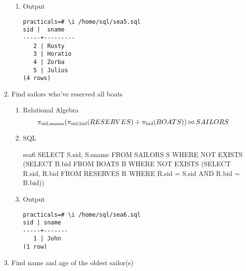 \begin{enumerate}
\begin{enumerate}
                  \item Output
                        \begin{lstlisting}[style=output]
practicals=# \i /home/sql/sea5.sql
sid |  sname  
-----+---------
   2 | Rusty
   3 | Horatio
   4 | Zorba
   5 | Julius
(4 rows)
                        \end{lstlisting}

            \end{enumerate}

      \item Find sailors who've reserved all boats

            \begin{enumerate}
                  \item Relational Algebra
                        \begin{equation*}
                              \pi_{\text{sid}, \text{sname}}(\pi_{\text{sid}, \text{bid}}(RESERVES) \div \pi_{\text{bid}}(BOATS)) \\
                              \bowtie SAILORS
                        \end{equation*}
                        \pagebreak
                  \item SQL
                        \begin{sqlQuery}{sea6}
                        SELECT S.sid, S.sname
                        FROM SAILORS S
                        WHERE NOT EXISTS
                              (SELECT B.bid
                              FROM BOATS B
                              WHERE NOT EXISTS
                                    (SELECT R.sid, R.bid
                                    FROM RESERVES R
                                    WHERE R.sid = S.sid
                                          AND R.bid = B.bid))
                  \end{sqlQuery}

                  \item Output
                        \begin{lstlisting}[style=output]
practicals=# \i /home/sql/sea6.sql
sid | sname 
-----+-------
   1 | John
(1 row)
                        \end{lstlisting}

            \end{enumerate}

      \item Find name and age of the oldest sailor(s)


\end{enumerate}
